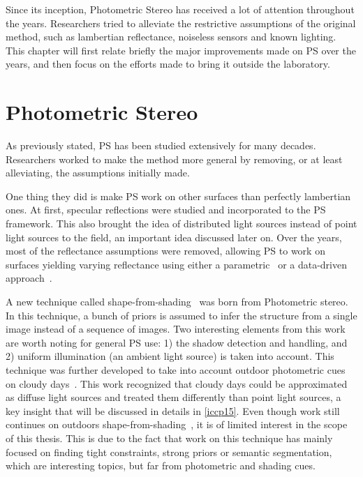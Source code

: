 \documentclass{report}
\begin{document}
Since its inception, Photometric Stereo has received a lot of attention throughout the years. Researchers tried to alleviate the restrictive assumptions of the original method, such as lambertian reflectance, noiseless sensors and known lighting. This chapter will first relate briefly the major improvements made on PS over the years, and then focus on the efforts made to bring it outside the laboratory.


\section{Photometric Stereo}

As previously stated, PS has been studied extensively for many decades. Researchers worked to make the method more general by removing, or at least alleviating, the assumptions initially made.

One thing they did is make PS work on other surfaces than perfectly lambertian ones. At first, specular reflections \cite{Ikeuchi1981} were studied and incorporated to the PS framework. This also brought the idea of distributed light sources instead of point light sources to the field, an important idea discussed later on. Over the years, most of the reflectance assumptions were removed, allowing PS to work on surfaces yielding varying reflectance using either a parametric~\cite{hertzmann-pami-05,goldman-tpami-10} or a data-driven approach~\cite{alldrin-cvpr-08}.

A new technique called shape-from-shading~\cite{Horn1989} was born from Photometric stereo. In this technique, a bunch of priors is assumed to infer the structure from a single image instead of a sequence of images. Two interesting elements from this work are worth noting for general PS use: 1) the shadow detection and handling, and 2) uniform illumination (an ambient light source) is taken into account. This technique was further developed to take into account outdoor photometric cues on cloudy days~\cite{Langer1994}. This work recognized that cloudy days could be approximated as diffuse light sources and treated them differently than point light sources, a key insight that will be discussed in details in \ref{iccp15}. Even though work still continues on outdoors shape-from-shading~\cite{oxholm-eccv-12,johnson-cvpr-11,barron-pami-15}, it is of limited interest in the scope of this thesis. This is due to the fact that work on this technique has mainly focused on finding tight constraints, strong priors or semantic segmentation, which are interesting topics, but far from photometric and shading cues.
\end{document}
